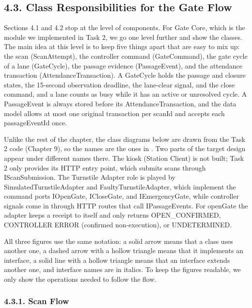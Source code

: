 \subsection*{4.3. Class Responsibilities for the Gate Flow}

{}


Sections 4.1 and 4.2 stop at the level of components. For Gate Core, which is the module we implemented in Task 2, we go one level further and show the classes. The main idea at this level is to keep five things apart that are easy to mix up: the scan (ScanAttempt), the controller command (GateCommand), the gate cycle of a lane (GateCycle), the passage evidence (PassageEvent), and the attendance transaction (AttendanceTransaction). A GateCycle holds the passage and closure states, the 15-second observation deadline, the lane-clear signal, and the close command, and a lane counts as busy while it has an active or unresolved cycle. A PassageEvent is always stored before its AttendanceTransaction, and the data model allows at most one original transaction per scanId and accepts each passageEventId once.

Unlike the rest of the chapter, the class diagrams below are drawn from the Task 2 code (Chapter 9), so the names are the ones in . Two parts of the target design appear under different names there. The kiosk (Station Client) is not built; Task 2 only provides its HTTP entry point, which submits scans through IScanSubmission. The Turnstile Adapter role is played by SimulatedTurnstileAdapter and FaultyTurnstileAdapter, which implement the command ports IOpenGate, ICloseGate, and IEmergencyGate, while controller signals come in through HTTP routes that call IPassageEvents. For openGate the adapter keeps a receipt to itself and only returns OPEN\_CONFIRMED, CONTROLLER ERROR (confirmed non-execution), or UNDETERMINED.

All three figures use the same notation: a solid arrow means that a class uses another one, a dashed arrow with a hollow triangle means that it implements an interface, a solid line with a hollow triangle means that an interface extends another one, and interface names are in italics. To keep the figures readable, we only show the operations needed to follow the flow.

\subsubsection*{4.3.1. Scan Flow}

